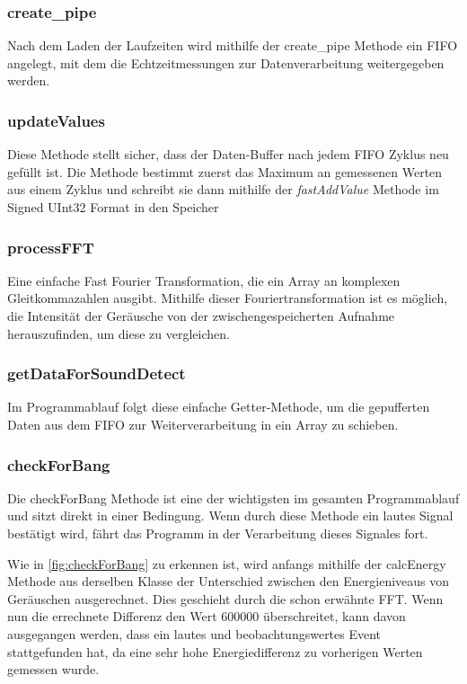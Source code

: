 \subsubsection{create\_pipe}

Nach dem Laden der Laufzeiten wird mithilfe der create\_pipe Methode ein FIFO angelegt, mit dem die Echtzeitmessungen zur Datenverarbeitung weitergegeben werden.

\subsubsection{updateValues}

Diese Methode stellt sicher, dass der Daten-Buffer nach jedem FIFO Zyklus neu gefüllt ist. Die Methode bestimmt zuerst das Maximum an gemessenen Werten aus einem Zyklus und schreibt sie dann mithilfe der \textit{fastAddValue} Methode im Signed UInt32 Format in den Speicher

\subsubsection{processFFT}

Eine einfache \glqq Fast Fourier Transformation\grqq, die ein Array an komplexen Gleitkommazahlen ausgibt. Mithilfe dieser Fouriertransformation ist es möglich, die Intensität der Geräusche von der zwischengespeicherten Aufnahme herauszufinden, um diese zu vergleichen.


\subsubsection{getDataForSoundDetect}

Im Programmablauf folgt diese einfache Getter-Methode, um die gepufferten Daten aus dem FIFO zur Weiterverarbeitung in ein Array zu schieben.

\subsubsection{checkForBang}

Die checkForBang Methode ist eine der wichtigsten im gesamten Programmablauf und sitzt direkt in einer Bedingung. Wenn durch diese Methode ein lautes Signal bestätigt wird, fährt das Programm in der Verarbeitung dieses Signales fort.

Wie in \autoref{fig:checkForBang} zu erkennen ist, wird anfangs mithilfe der calcEnergy Methode aus derselben Klasse der Unterschied zwischen den Energieniveaus von Geräuschen ausgerechnet. Dies geschieht durch die schon erwähnte FFT. Wenn nun die errechnete Differenz den Wert 600000 überschreitet, kann davon ausgegangen werden, dass ein lautes und beobachtungswertes Event stattgefunden hat, da eine sehr hohe Energiedifferenz zu vorherigen Werten gemessen wurde.


